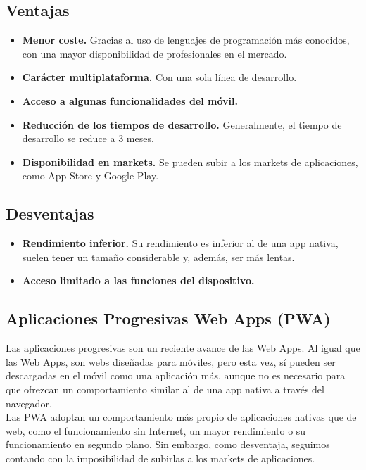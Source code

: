 \subsection*{Ventajas}
\begin{itemize}
	\item \textbf{Menor coste.} Gracias al uso de lenguajes de programación más conocidos, con una mayor disponibilidad de profesionales en el mercado.
	\item \textbf{Carácter multiplataforma.} Con una sola línea de desarrollo.
	\item \textbf{Acceso a algunas funcionalidades del móvil.}
	\item \textbf{Reducción de los tiempos de desarrollo.} Generalmente, el tiempo de desarrollo se reduce a 3 meses.
	\item \textbf{Disponibilidad en markets.} Se pueden subir a los markets de aplicaciones, como App Store y Google Play.
\end{itemize}

\subsection*{Desventajas}
\begin{itemize}
	\item \textbf{Rendimiento inferior.} Su rendimiento es inferior al de una app nativa, suelen tener un tamaño considerable y, además, ser más lentas.
	\item \textbf{Acceso limitado a las funciones del dispositivo.}
\end{itemize}

\subsection{Aplicaciones Progresivas Web Apps (PWA)}

Las aplicaciones progresivas son un reciente avance de las Web Apps. Al igual que las Web Apps, son webs diseñadas para móviles, pero esta vez, sí pueden ser descargadas en el móvil como una aplicación más, aunque no es necesario para que ofrezcan un comportamiento similar al de una app nativa a través del navegador. \\

Las PWA adoptan un comportamiento más propio de aplicaciones nativas que de web, como el funcionamiento sin Internet, un mayor rendimiento o su funcionamiento en segundo plano. Sin embargo, como desventaja, seguimos contando con la imposibilidad de subirlas a los markets de aplicaciones. \\

